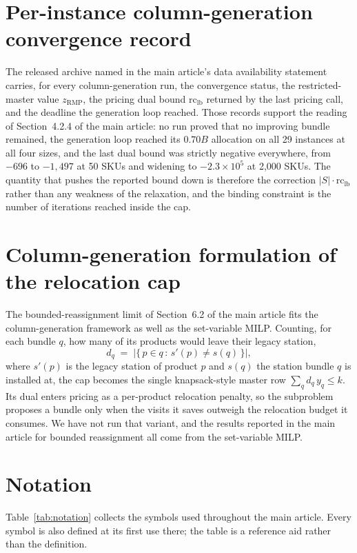 \documentclass[11pt]{article}
\begin{document}
\section{Per-instance column-generation convergence record}\label{sup:cgrecord}
The released archive named in the main article's data availability statement carries, for every
column-generation run, the convergence status, the restricted-master value $z_{\mathrm{RMP}}$, the
pricing dual bound $\mathrm{rc}_{\mathrm{lb}}$ returned by the last pricing call, and the deadline
the generation loop reached. Those records support the reading of Section~4.2.4 of the main
article: no run proved that no improving bundle remained, the generation loop reached its $0.70B$
allocation on all 29 instances at all four sizes, and the last dual bound was strictly negative
everywhere, from $-696$ to $-1{,}497$ at 50 SKUs and widening to $-2.3\times10^{5}$ at 2,000 SKUs.
The quantity that pushes the reported bound down is therefore the correction
$|S|\cdot\mathrm{rc}_{\mathrm{lb}}$ rather than any weakness of the relaxation, and the binding
constraint is the number of iterations reached inside the cap.

\section{Column-generation formulation of the relocation cap}\label{sup:relocap}
The bounded-reassignment limit of Section~6.2 of the main article fits the column-generation
framework as well as the set-variable MILP. Counting, for each bundle $q$, how many of its products
would leave their legacy station,
\[
d_q \;=\; \bigl|\{\, p \in q \,:\, s'(p) \neq s(q) \,\}\bigr|,
\]
where $s'(p)$ is the legacy station of product $p$ and $s(q)$ the station bundle $q$ is installed
at, the cap becomes the single knapsack-style master row $\sum_q d_q\, y_q \le k$. Its dual enters
pricing as a per-product relocation penalty, so the subproblem proposes a bundle only when the
visits it saves outweigh the relocation budget it consumes. We have not run that variant, and the
results reported in the main article for bounded reassignment all come from the set-variable MILP.

\section{Notation}\label{sup:notation}
Table~\ref{tab:notation} collects the symbols used throughout the main article. Every symbol is
also defined at its first use there; the table is a reference aid rather than the definition.
\end{document}
